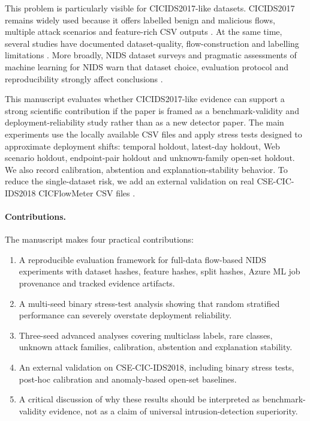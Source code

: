\documentclass[11pt,a4paper]{article}
\begin{document}
This problem is particularly visible for CICIDS2017-like datasets. CICIDS2017 remains widely used because it offers labelled benign and malicious flows, multiple attack scenarios and feature-rich CSV outputs \cite{sharafaldin2018cicids,unbCICIDS2017}. At the same time, several studies have documented dataset-quality, flow-construction and labelling limitations \cite{engelen2021troubleshooting,rosay2022cicidsanalysis}. More broadly, NIDS dataset surveys and pragmatic assessments of machine learning for NIDS warn that dataset choice, evaluation protocol and reproducibility strongly affect conclusions \cite{ring2019survey,goldschmidt2025nidsdatasets,sommer2010outside,apruzzese2023pragmatic}.

This manuscript evaluates whether CICIDS2017-like evidence can support a strong scientific contribution if the paper is framed as a benchmark-validity and deployment-reliability study rather than as a new detector paper. The main experiments use the locally available CSV files and apply stress tests designed to approximate deployment shifts: temporal holdout, latest-day holdout, Web scenario holdout, endpoint-pair holdout and unknown-family open-set holdout. We also record calibration, abstention and explanation-stability behavior. To reduce the single-dataset risk, we add an external validation on real CSE-CIC-IDS2018 CICFlowMeter CSV files \cite{unbCSECICIDS2018}.

\paragraph{Contributions.}
The manuscript makes four practical contributions:
\begin{enumerate}[leftmargin=*]
  \item A reproducible evaluation framework for full-data flow-based NIDS experiments with dataset hashes, feature hashes, split hashes, Azure ML job provenance and tracked evidence artifacts.
  \item A multi-seed binary stress-test analysis showing that random stratified performance can severely overstate deployment reliability.
  \item Three-seed advanced analyses covering multiclass labels, rare classes, unknown attack families, calibration, abstention and explanation stability.
  \item An external validation on CSE-CIC-IDS2018, including binary stress tests, post-hoc calibration and anomaly-based open-set baselines.
  \item A critical discussion of why these results should be interpreted as benchmark-validity evidence, not as a claim of universal intrusion-detection superiority.
\end{enumerate}
\end{document}
